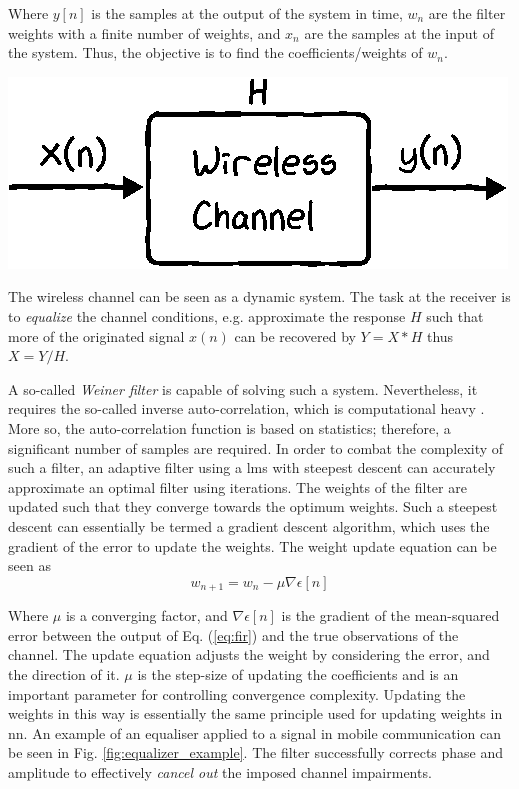 Where $y[n]$ is the samples at the output of the system in time, $w_n$ are the filter weights with a finite number of weights, and $x_n$ are the samples at the input of the system. Thus, the objective is to find the coefficients/weights of $w_n$. 

\begin{marginfigure}
\includegraphics[]{chapters/part_pathloss/figures/adaptive_filter.eps}
\caption{The wireless channel can be seen as a dynamic system. The task at the receiver is to \emph{equalize} the channel conditions, e.g. approximate the response $H$ such that more of the originated signal $x(n)$ can be recovered by $Y = X*H$ thus $X = Y/H$.}\label{fig:adaptive_filter_system}
\end{marginfigure}

A so-called \emph{Weiner filter} is capable of solving such a system. Nevertheless, it requires the so-called inverse auto-correlation, which is computational heavy \cite{Tan2013DigitalProcessing}. More so, the auto-correlation function is based on statistics; therefore, a significant number of samples are required. In order to combat the complexity of such a filter, an adaptive filter using a \gls{lms} with steepest descent can accurately approximate an optimal filter using iterations. The weights of the filter are updated such that they converge towards the optimum weights. Such a steepest descent can essentially be termed a gradient descent algorithm, which uses the gradient of the error to update the weights. The weight update equation can be seen as
\begin{equation}
    w_{n+1} = w_n - \mu \nabla  \epsilon [n]
\end{equation}

Where $\mu$ is a converging factor, and $\nabla  \epsilon [n]$ is the gradient of the mean-squared error between the output of Eq. (\ref{eq:fir}) and the true observations of the channel. The update equation adjusts the weight by considering the error, and the direction of it. $\mu$ is the step-size of updating the coefficients and is an important parameter for controlling convergence complexity. Updating the weights in this way is essentially the same principle used for updating weights in \gls{nn}. An example of an equaliser applied to a signal in mobile communication can be seen in Fig. \ref{fig:equalizer_example}. The filter successfully corrects phase and amplitude to effectively \emph{cancel out} the imposed channel impairments.

